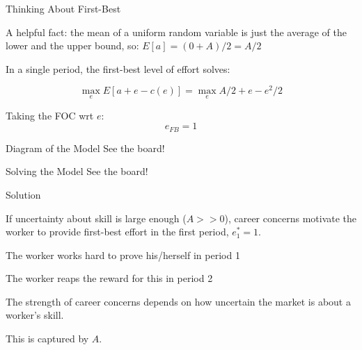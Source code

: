 \documentclass[aspectratio=169,usenames,dvipsnames]{beamer}
\newenvironment{wideitemize}{\itemize\addtolength{\itemsep}{10pt}}{\enditemize}
\begin{document}
\begin{frame}{Thinking About First-Best}

\begin{wideitemize}
    \item A helpful fact: the mean of a uniform random variable is just the average of the lower and the upper bound, so: $E[a]=(0+A)/2=A/2$\pause
    \item In a single period, the first-best level of effort solves:

    \[\max_{e} E[a+e -c(e)] =  \max_{e} A/2+e-e^2/2  \]
    \pause
    \item Taking the FOC wrt $e$:
    \[e_{FB}= 1\]
    
\end{wideitemize}
    
\end{frame}

\begin{frame}{Diagram of the Model}
\centering
    \huge See the board!

\end{frame}

\begin{frame}{Solving the Model}
\centering
    \huge See the board!

\end{frame}

\begin{frame}{Solution}

\begin{theorem}
    If uncertainty about skill is large enough ($A>>0$), career concerns motivate the worker to provide first-best effort in the first period, $e_1^*=1$.
\end{theorem}
    \begin{wideitemize}
        \item The worker works hard to prove his/herself in period 1
        \item The worker reaps the reward for this in period 2
        \item The strength of career concerns depends on how uncertain the market is about a worker's skill.
        \item This is captured by $A$.
    \end{wideitemize}
\end{frame}
\end{document}
